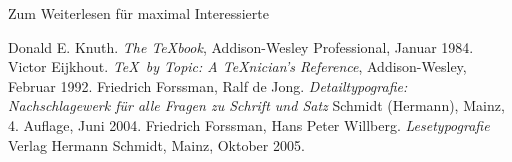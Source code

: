 \begin{frame}[fragile]{Zum Weiterlesen für maximal Interessierte}
  \begin{mybib}
      Donald E. Knuth.
      \newblock \emph{The \TeX book},
      \newblock Addison-Wesley Professional, Januar 1984.
      Victor Eijkhout.
      \newblock \emph{\TeX\ by Topic: A \TeX nician's Reference},
      \newblock Addison-Wesley, Februar 1992.
      Friedrich Forssman, Ralf de Jong.
      \newblock \emph{Detailtypografie: Nachschlagewerk für alle Fragen zu Schrift und Satz}
      \newblock Schmidt (Hermann), Mainz, 4. Auflage, Juni 2004.
      Friedrich Forssman, Hans Peter Willberg.
      \newblock \emph{Lesetypografie}
      \newblock Verlag Hermann Schmidt, Mainz, Oktober 2005.
  \end{mybib}
\end{frame}
